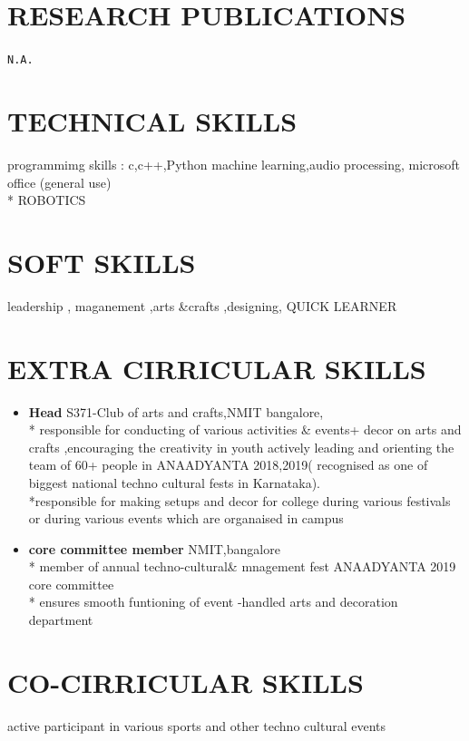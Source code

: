 \documentclass[12pt,a4paper,sans]{article}
\begin{document}
\section*{RESEARCH PUBLICATIONS}
  \verb|N.A.|
\section*{TECHNICAL SKILLS}
   programmimg skills : c,c++,Python
   machine learning,audio processing,
   microsoft office (general use)
   \\*
   ROBOTICS
\section*{SOFT SKILLS}
  leadership , maganement ,arts &crafts ,designing, QUICK LEARNER
\section*{EXTRA CIRRICULAR SKILLS}

 	\begin{itemize}
 		
 		\item  \textbf{Head}
 		S371-Club of arts and crafts,NMIT
 		bangalore,\\*
 		 responsible for conducting of various activities \& events+ decor on arts and
 		crafts ,encouraging the creativity in youth
 		actively leading and orienting the team of 60+ people in ANAADYANTA
 		2018,2019( recognised as one of biggest national techno cultural fests
 		in Karnataka).\\*responsible for making setups and decor for college
 		during various festivals or during various events which are organaised
 		in campus
 		\item  \textbf{core committee member}
 		NMIT,bangalore\\*
 		member of annual techno-cultural& mnagement fest ANAADYANTA 2019 core
 		committee\\*
 		ensures smooth funtioning of event -handled arts and decoration
 		department
 		
 	\end{itemize}
 	
 \section*{CO-CIRRICULAR SKILLS}
 	\noindent
 	active participant in various sports and other techno cultural events 
 	
\end{document}
